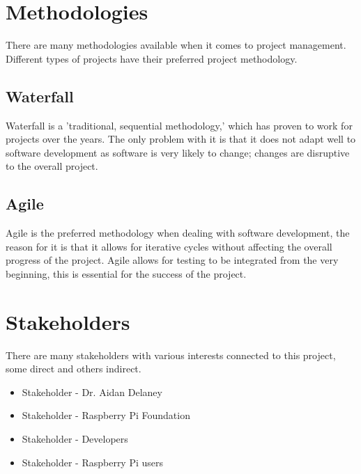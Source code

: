 \documentclass[12pt,a4paper]{report}
\begin{document}
\section{Methodologies}
There are many methodologies \citep{methodologies} available when it comes to project management. Different types of projects have their preferred project methodology.
\subsection{Waterfall}
Waterfall is a 'traditional, sequential methodology,' which has proven to work for projects over the years. The only problem with it is that it does not adapt well to software development as software is very likely to change; changes are disruptive to the overall project.  
\subsection{Agile}
Agile is the preferred methodology when dealing with software development, the reason for it is that it allows for iterative cycles without affecting the overall progress of the project. Agile allows for testing to be integrated from the very beginning, this is essential for the success of the project.  

\section{Stakeholders}
There are many stakeholders with various interests connected to this project, some direct and others indirect. 

\begin{itemize}
  \item{Stakeholder - Dr. Aidan Delaney}
  \item{Stakeholder - Raspberry Pi Foundation}
  \item{Stakeholder - Developers}
  \item{Stakeholder - Raspberry Pi users}
\end{itemize}
\end{document}

